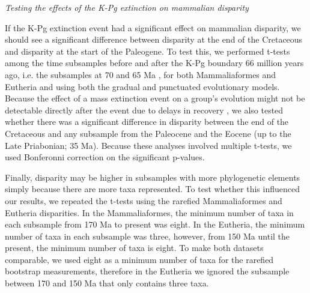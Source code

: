 \documentclass[12pt,letterpaper]{article}
\renewcommand{\subsection}[1]{%
\bigskip
\begin{center}
\begin{large}
\normalfont\itshape #1
\end{large}
\end{center}}
\begin{document}
\subsection{Testing the effects of the K-Pg extinction on mammalian disparity}
If the K-Pg extinction event had a significant effect on mammalian disparity, we should see a significant difference between disparity at the end of the Cretaceous and disparity at the start of the Paleogene.
To test this, we performed t-tests among the time subsamples before and after the K-Pg boundary 66 million years ago, i.e. the subsamples at 70 and 65 Ma \citep[e.g. as used in]{anderson2012using,zelditch2012geometric,smith2014joined}, for both Mammaliaformes and Eutheria and using both the gradual and punctuated evolutionary models.
Because the effect of a mass extinction event on a group's evolution might not be detectable directly after the event due to delays in recovery \citep[e.g.][estimated that ecosystems fully recovered 8 to 9 Ma after the Permo-Triassic Mass Extinction 251 Ma]{chen2012timing}, we also tested whether there was a significant difference in disparity between the end of the Cretaceous and any subsample from the Paleocene and the Eocene (up to the Late Priabonian; 35 Ma).
Because these analyses involved multiple t-tests, we used Bonferonni correction \citep{holm1979simple} on the significant p-values.

Finally, disparity may be higher in subsamples with more phylogenetic elements simply because there are more taxa represented.
To test whether this influenced our results, we repeated the t-tests using the rarefied Mammaliaformes and Eutheria disparities.
In the Mammaliaformes, the minimum number of taxa in each subsample from 170 Ma to present was eight.
In the Eutheria, the minimum number of taxa in each subsample was three, however, from 150 Ma until the present, the minimum number of taxa is eight.
To make both datasets comparable, we used eight as a minimum number of taxa for the rarefied bootstrap measurements, therefore in the Eutheria we ignored the subsample between 170 and 150 Ma that only contains three taxa.


\end{document}
